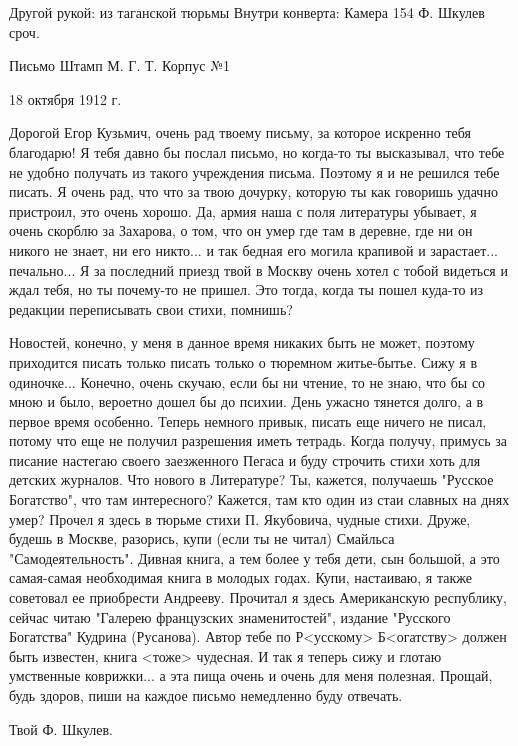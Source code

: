 \documentclass[]{memoir}
\begin{document}

Другой рукой: из таганской тюрьмы
Внутри конверта: Камера 154 Ф. Шкулев сроч.

Письмо
Штамп М. Г. Т. Корпус №1

18 октября 1912 г.

Дорогой Егор Кузьмич, очень рад твоему письму, за которое искренно тебя благодарю!
Я тебя давно бы послал письмо, но когда-то ты высказывал, что тебе не удобно получать из такого учреждения письма. Поэтому я и не решился тебе писать. Я очень рад, что что за твою дочурку, которую ты как говоришь удачно пристроил, это очень хорошо. Да, армия наша с поля литературы убывает, я очень скорблю за Захарова, о том, что он умер где там в деревне, где ни он никого не знает, ни его никто... и так бедная его могила крапивой и зарастает... печально...
Я за последний приезд твой в Москву очень хотел с тобой видеться и ждал тебя, но ты почему-то не пришел. Это тогда, когда ты пошел куда-то из редакции переписывать свои стихи, помнишь?

Новостей, конечно, у меня в данное время никаких быть не может, поэтому приходится писать только писать только о тюремном житье-бытье. Сижу я в одиночке... Конечно, очень скучаю, если бы ни чтение, то не знаю, что бы со мною и было,  вероетно дошел бы до психии. День ужасно тянется долго, а в первое время особенно.
Теперь немного привык, писать еще ничего не писал, потому что еще не получил разрешения иметь тетрадь.
Когда получу, примусь за писание настегаю своего заезженного Пегаса и буду строчить стихи хоть для детских журналов. Что нового в Литературе? Ты, кажется, получаешь "Русское Богатство", что там интересного? Кажется, там кто один из стаи славных на днях умер? Прочел я здесь в тюрьме стихи П. Якубовича, чудные стихи. Друже, будешь в Москве, разорись, купи (если ты не читал) Смайльса "Самодеятельность". Дивная книга, а тем более у тебя дети, сын большой, а это самая-самая необходимая книга в молодых годах. Купи, настаиваю, я также советовал ее приобрести Андрееву. Прочитал я здесь Американскую республику, сейчас читаю "Галерею французских знаменитостей", издание "Русского Богатства" Кудрина (Русанова). Автор тебе по Р<усскому> Б<огатству> должен быть известен, книга <тоже> чудесная. И так я теперь сижу и глотаю умственные коврижки... а эта пища очень и очень для меня полезная.
Прощай, будь здоров, пиши на каждое письмо немедленно буду отвечать.

Твой Ф. Шкулев.
\end{document}
